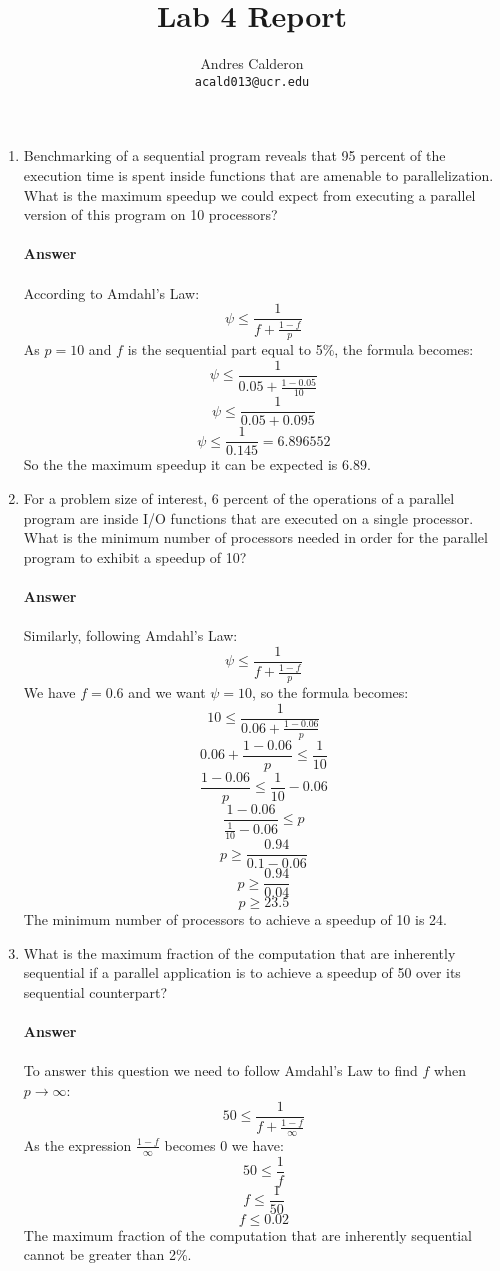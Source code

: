 \documentclass[10pt]{scrartcl}
\title{Lab 4 Report}
\author{
   Andres Calderon\\
  \small \texttt{acald013@ucr.edu}
}
\begin{document}
\maketitle

\begin{enumerate}
 \item Benchmarking of a sequential program reveals that 95 percent of the execution time is spent inside functions that are amenable to parallelization. What is the maximum speedup we could expect from executing a parallel version of this program on 10 processors?\\
 \\ 
 \textbf{Answer}\\
 \\
 According to Amdahl's Law:
 $$ \psi \leq \frac{1}{f + \frac{1 - f}{p}} $$
 As $p=10$ and $f$ is the sequential part equal to 5\%, the formula becomes:
 $$ \psi \leq \frac{1}{0.05 + \frac{1 - 0.05}{10}} $$
 $$ \psi \leq \frac{1}{0.05 + 0.095} $$
 $$ \psi \leq \frac{1}{0.145} = 6.896552$$
 So the the maximum speedup it can be expected is $6.89$.
 
 \item For a problem size of interest, 6 percent of the operations of a parallel program are inside I/O functions that are executed on a single processor. What is the minimum number of processors needed in order for the parallel program to exhibit a speedup of 10?\\
 \\ 
 \textbf{Answer}\\
 \\
 Similarly, following Amdahl's Law:
 $$ \psi \leq \frac{1}{f + \frac{1 - f}{p}} $$
 We have $f=0.6$ and we want $\psi=10$, so the formula becomes:
 $$ 10 \leq \frac{1}{0.06 + \frac{1 - 0.06}{p}} $$
 $$ 0.06 + \frac{1 - 0.06}{p} \leq \frac{1}{10} $$
 $$ \frac{1 - 0.06}{p} \leq \frac{1}{10} - 0.06 $$
 $$ \frac{1 - 0.06}{\frac{1}{10} - 0.06 } \leq p$$
 $$ p \geq \frac{0.94}{0.1 - 0.06 } $$
 $$ p \geq \frac{0.94}{0.04} $$
 $$ p \geq 23.5 $$
 The minimum number of processors to achieve a speedup of 10 is 24.
 
 \item What is the maximum fraction of the computation that are inherently sequential if a parallel application is to achieve a speedup of 50 over its sequential counterpart?\\
 \\ 
 \textbf{Answer}\\
 \\
 To answer this question we need to follow Amdahl's Law to find $f$ when $p \rightarrow \infty$:
 $$ 50 \leq \frac{1}{f + \frac{1 - f}{\infty}} $$
 As the expression $\frac{1 - f}{\infty}$ becomes $0$ we have:
 $$ 50 \leq \frac{1}{f} $$
 $$ f \leq \frac{1}{50} $$
 $$ f \leq 0.02 $$
 The maximum fraction of the computation that are inherently sequential cannot be greater than 2\%. 
 

\end{enumerate}
\end{document}
